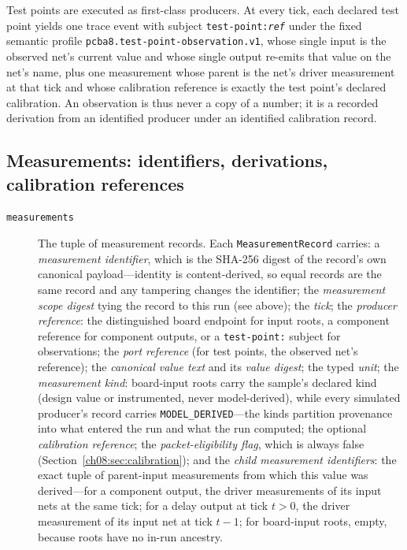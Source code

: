 Test points are executed as first-class producers. At every tick, each declared test point yields one trace event with subject \texttt{test-point:\emph{ref}} under the fixed semantic profile \texttt{pcba8.test-point-observation.v1}, whose single input is the observed net's current value and whose single output re-emits that value on the net's name, plus one measurement whose parent is the net's driver measurement at that tick and whose calibration reference is exactly the test point's declared calibration. An observation is thus never a copy of a number; it is a recorded derivation from an identified producer under an identified calibration record.

\subsection{Measurements: identifiers, derivations, calibration references}

\begin{description}
\item[\texttt{measurements}] The tuple of measurement records. Each \texttt{MeasurementRecord} carries:
a \emph{measurement identifier}, which is the SHA-256 digest of the record's own canonical payload---identity is content-derived, so equal records are the same record and any tampering changes the identifier;
the \emph{measurement scope digest} tying the record to this run (see above);
the \emph{tick};
the \emph{producer reference}: the distinguished board endpoint for input roots, a component reference for component outputs, or a \texttt{test-point:} subject for observations;
the \emph{port reference} (for test points, the observed net's reference);
the \emph{canonical value text} and its \emph{value digest};
the typed \emph{unit};
the \emph{measurement kind}: board-input roots carry the sample's declared kind (design value or instrumented, never model-derived), while every simulated producer's record carries \texttt{MODEL\_DERIVED}---the kinds partition provenance into what entered the run and what the run computed;
the optional \emph{calibration reference};
the \emph{packet-eligibility flag}, which is always false (Section~\ref{ch08:sec:calibration});
and the \emph{child measurement identifiers}: the exact tuple of parent-input measurements from which this value was derived---for a component output, the driver measurements of its input nets at the same tick; for a delay output at tick $t>0$, the driver measurement of its input net at tick $t-1$; for board-input roots, empty, because roots have no in-run ancestry.
\end{description}

